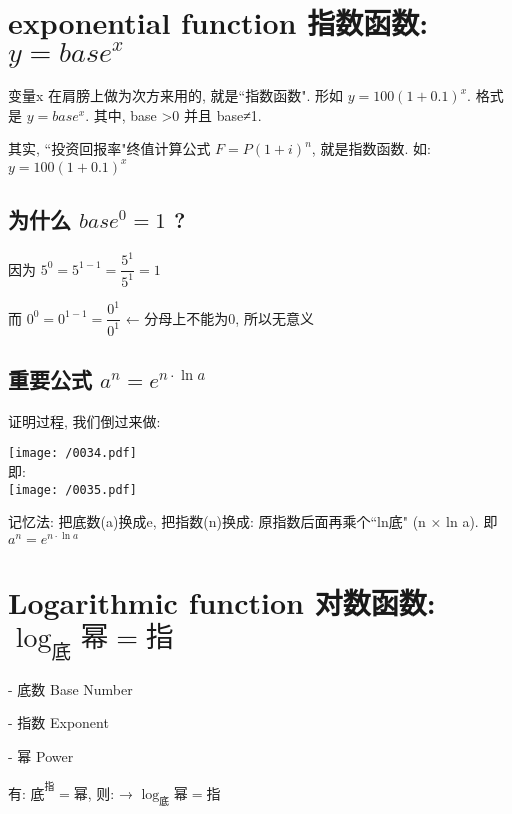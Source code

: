 \documentclass[UTF8]{ctexart}
\begin{document}
\section{exponential function 指数函数:  $ y=base^x $}

变量x 在肩膀上做为次方来用的, 就是``指数函数". 形如 $ y=100(1+0.1)^x $. 格式是   $ y=base^x $. 其中, base \textgreater 0 并且 base≠1.

其实, ``投资回报率"终值计算公式 $ F=P(1+i)^n $, 就是指数函数. 如: $ y=100(1+0.1)^x $ 


\subsection{为什么 $base^0=1$ ?}

因为 $ 5^0 =5^{1-1}=\dfrac{5^1} {5^1} =1$

而 $ 0^0 =0^{1-1}=\dfrac{0^1} {0^1} $ ← 分母上不能为0, 所以无意义





\subsection{重要公式 $ a^n=e^{n\cdot \ln a}$}

证明过程, 我们倒过来做: \\

\begin{myEnvSample}
\texttt{[image: /0034.pdf]} \\

即: \\
\texttt{[image: /0035.pdf]}
\end{myEnvSample}

记忆法: 把底数(a)换成e, 把指数(n)换成: 原指数后面再乘个``ln底" (n × ln a).  即 $a^n=e^{n\cdot \ln a}$




\section{Logarithmic function 对数函数:  $ \log _{\text{底}}\text{幂}=\text{指} $}

- 底数 Base Number

- 指数 Exponent

- 幂 Power

有: $\text{底}^{\text{指}}=\text{幂}$,  则: → $ \log _{\text{底}}\text{幂}=\text{指} $ \\
\end{document}
